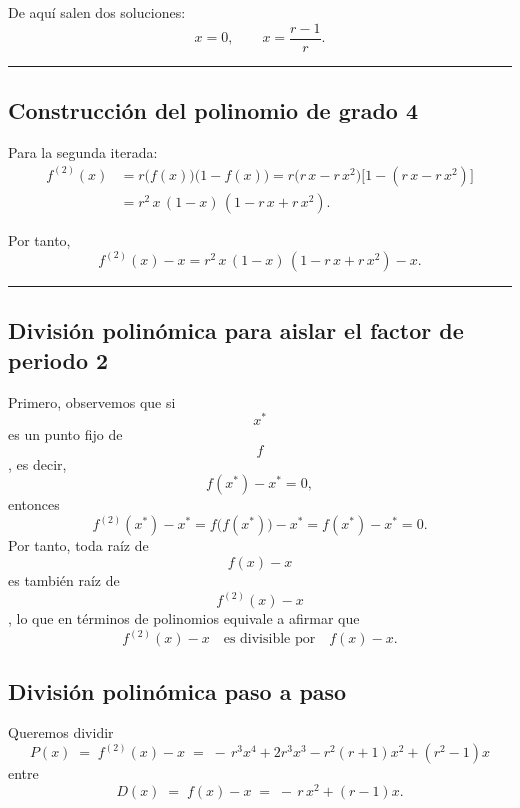 \documentclass[
  11pt,
  a4paper,
  DIV=11,
  numbers=noendperiod]{scrreprt}
\begin{document}
De aquí salen dos soluciones:\\
\[
x = 0,
\qquad
x = \frac{r-1}{r}.
\]

\begin{center}\rule{0.5\linewidth}{0.5pt}\end{center}

\subsection{Construcción del polinomio de grado
4}\label{construcciuxf3n-del-polinomio-de-grado-4}

Para la segunda iterada:\\
\[
\begin{align*}
f^{(2)}(x)
&= r\bigl(f(x)\bigr)\bigl(1 - f(x)\bigr)
= r\bigl(r\,x - r\,x^2\bigr)\bigl[1 - (r\,x - r\,x^2)\bigr]\\[6pt]
&= r^2\,x\,(1 - x)\,(1 - r\,x + r\,x^2).
\end{align*}
\]

Por tanto,\\
\[
f^{(2)}(x) - x
= r^2\,x\,(1 - x)\,(1 - r\,x + r\,x^2) - x.
\]

\begin{center}\rule{0.5\linewidth}{0.5pt}\end{center}

\subsection{División polinómica para aislar el factor de periodo
2}\label{divisiuxf3n-polinuxf3mica-para-aislar-el-factor-de-periodo-2}

Primero, observemos que si \[x^*\] es un punto fijo de \[f\], es decir,
\[
f(x^*) - x^* = 0,
\] entonces \[
f^{(2)}(x^*) - x^* 
= f\bigl(f(x^*)\bigr) - x^* 
= f(x^*) - x^* 
= 0.
\] Por tanto, toda raíz de \[f(x)-x\] es también raíz de
\[f^{(2)}(x)-x\], lo que en términos de polinomios equivale a afirmar
que \[
f^{(2)}(x)-x
\quad\text{es divisible por}\quad
f(x)-x.
\]

\subsection*{División polinómica paso a paso}

Queremos dividir\\
\[
P(x) \;=\; f^{(2)}(x)-x 
         \;=\; -\,r^3x^4 + 2r^3x^3 - r^2(r+1)x^2 + (r^2-1)x
\] entre\\
\[
D(x) \;=\; f(x)-x 
         \;=\; -\,r\,x^2 + (r-1)x.
\]
\end{document}
